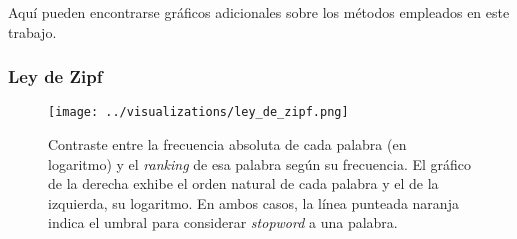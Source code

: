 Aquí pueden encontrarse gráficos adicionales sobre los métodos empleados
en este trabajo.

\subsubsection{Ley de Zipf}
\label{appendix-plots-zipf-law}
\begin{figure}[h!]
    \centering
    \texttt{[image: ../visualizations/ley\_de\_zipf.png]}
    \caption{Contraste entre la frecuencia absoluta de cada palabra (en logaritmo)
    y el \textit{ranking} de esa palabra según su frecuencia. El gráfico de la
    derecha exhibe el orden natural de cada palabra y el de la izquierda, su logaritmo.
    En ambos casos, la línea punteada naranja indica el umbral
    para considerar \textit{stopword} a una palabra.}
    \label{fig-zipf-law}
\end{figure}


